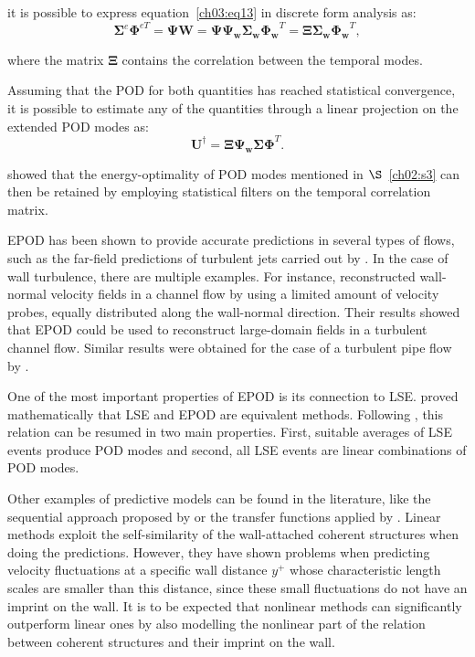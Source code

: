 \noindent it is possible to express equation~\ref{ch03:eq13} in discrete form analysis as:
\begin{equation}
    \boldsymbol{\Sigma}^e\boldsymbol{\Phi}^{eT}=\boldsymbol{\Psi}\boldsymbol{W}=\boldsymbol{\Psi}\boldsymbol{\Psi_w}\boldsymbol{\Sigma_w}\boldsymbol{\Phi_w}^T=\boldsymbol{\Xi}\boldsymbol{\Sigma_w}\boldsymbol{\Phi_w}^T,
    \label{ch03:eq16}
\end{equation}

\noindent where the matrix $\boldsymbol{\Xi}$ contains the correlation between the temporal modes.

Assuming that the POD for both quantities has reached statistical convergence, it is possible to estimate any of the quantities through a linear projection on the extended POD modes as:
\begin{equation}
  \boldsymbol{U}^{\dagger} =  \boldsymbol{\Xi}\boldsymbol{\Psi_w}\boldsymbol{\Sigma}\boldsymbol{\Phi}^T.
  \label{ch03:eq15}
\end{equation}

\noindent \citet{discetti2018estimation} showed that the energy-optimality of POD modes mentioned in $\S$~\ref{ch02:s3} can then be retained by employing statistical filters on the temporal correlation matrix.

EPOD has been shown to provide accurate predictions in several types of flows, such as the far-field predictions of turbulent jets carried out by \citet{tinney2008low}.
In the case of wall turbulence, there are multiple examples.
For instance, \citet{discetti2018estimation} reconstructed wall-normal velocity fields in a channel flow by using a limited amount of velocity probes, equally distributed along the wall-normal direction.
Their results showed that EPOD could be used to reconstruct large-domain fields in a turbulent channel flow.
Similar results were obtained for the case of a turbulent pipe flow by \citet{discetti2019characterization}.


One of the most important properties of EPOD is its connection to LSE.
\citet{boree2003extended} proved mathematically that LSE and EPOD are equivalent methods.
Following \citet{holmes2012turbulence}, this relation can be resumed in two main properties.
First, suitable averages of LSE events produce POD modes and second, all LSE events are linear combinations of POD modes.

Other examples of predictive models can be found in the literature, like the sequential approach proposed by \citet{suzuki2017estimation} or the transfer functions applied by \citet{sasaki2019transfer}.
Linear methods exploit the self-similarity of the wall-attached coherent structures when doing the predictions.
However, they have shown problems when predicting velocity fluctuations at a specific wall distance $y^+$ whose characteristic length scales are smaller than this distance, since these small fluctuations do not have an imprint on the wall.
It is to be expected that nonlinear methods can significantly outperform linear ones by also modelling the nonlinear part of the relation between coherent structures and their imprint on the wall.
